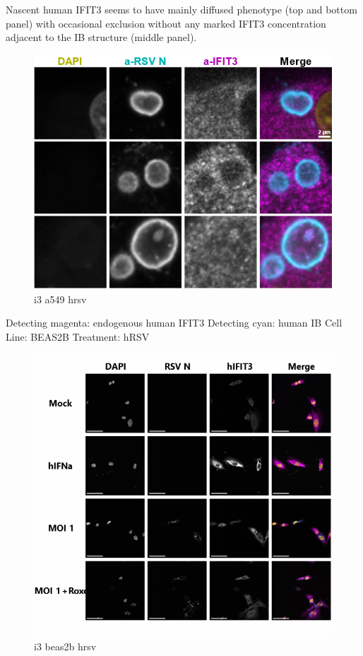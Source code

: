 Nascent human IFIT3 seems to have mainly diffused phenotype (top and bottom panel) with occasional exclusion without any marked IFIT3 concentration adjacent to the IB structure (middle panel).

\begin{figure}
    \centering
    \includegraphics[width=1\linewidth]{09. Chapter 4/Figs/04. IFIT3/02. a549 hrsv.png}
    \caption[i3 a549 hrsv]{i3 a549 hrsv}
    \label{fig:i3 a549 hrsv}
\end{figure}

Detecting magenta: endogenous human IFIT3 \newline
Detecting cyan: human IB \newline
Cell Line: BEAS2B \newline
Treatment: hRSV \newline

\begin{figure}
    \centering
    \includegraphics[width=1\linewidth]{09. Chapter 4/Figs/04. IFIT3/03. beas2b hrsv.png}
    \caption[i3 beas2b hrsv]{i3 beas2b hrsv}
    \label{fig:i3 beas2b hrsv}
\end{figure}

